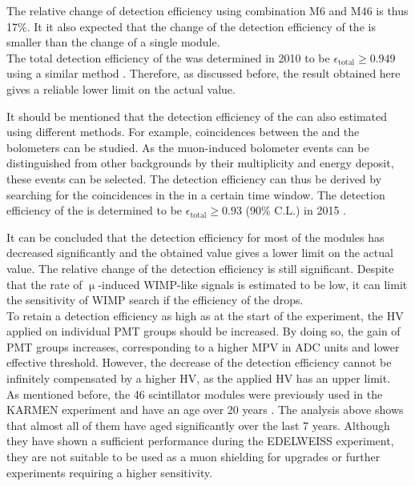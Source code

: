 The relative change of detection efficiency using combination M6 and M46 is thus 17\%. It it also expected that the change of the detection efficiency of the \mvs{} is smaller than the change of a single module. \\
The total detection efficiency of the \mvs{} was determined in 2010 to be $\epsilon_{\mathrm{total}} \geq 0.949$ using a similar method \cite{Nie10}. Therefore, as discussed before, the result obtained here gives a reliable lower limit on the actual value.

It should be mentioned that the detection efficiency of the \mvs{} can also estimated using different methods. For example, coincidences between the \mvs{} and the bolometers can be studied. As the muon-induced bolometer events can be distinguished from other backgrounds by their multiplicity and energy deposit, these events can be selected. The detection efficiency can thus be derived by searching for the coincidences in the \mvs{} in a certain time window. The detection efficiency of the \mvs{} is determined to be $\epsilon_{\mathrm{total}} \geq 0.93$ (90\% C.L.) in 2015 \cite{Kef16}.

It can be concluded that the detection efficiency for most of the modules has decreased significantly and the obtained value gives a lower limit on the actual value. The relative change of the detection efficiency is still significant.
Despite that the rate of $\upmu{}$-induced WIMP-like signals is estimated to be low, it can limit the sensitivity of WIMP search if the efficiency of the \mvs{} drops. \\
To retain a detection efficiency as high as at the start of the experiment, the HV applied on individual PMT groups should be increased. By doing so, the gain of PMT groups increases, corresponding to a higher MPV in ADC units and lower effective threshold. However, the decrease of the detection efficiency cannot be infinitely compensated by a higher HV, as the applied HV has an upper limit.\\
As mentioned before, the 46 scintillator modules were previously used in the KARMEN experiment and have an age over 20 years \cite{Rei98}. The analysis above shows that almost all of them have aged significantly over the last 7 years. Although they have shown a sufficient performance during the EDELWEISS experiment, they are not suitable to be used as a muon shielding for upgrades or further experiments requiring a higher sensitivity.






